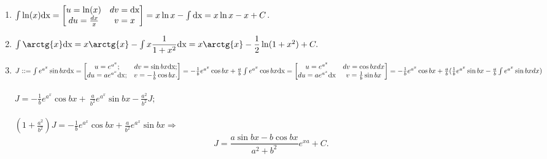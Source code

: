 \begin{example}
	\begin{enumerate}
		\item  $\int \limits \ln(x)\text{dx} =  \begin{bmatrix}   u  = \ln(x) & dv = \text{dx} \\ du = 
			\frac{dx}{x}&   v = x  
		\end{bmatrix}  = x\ln x - \int\limits \text{dx} = x\ln x - x + C$.
		\item  $\int\limits \arctg{x} \dx = x \arctg{x} - \int\limits x 
		\dfrac{1}{1 + x^2}\dx= x \arctg{x} - \dfrac{1}{2}\ln(1 + x^2) + C.$
		\item  $J::=  \int e^{a^x} \sin{bx}\text{dx}= \begin{bmatrix} u = e^{a^x}; & dv = \sin{bx}\text{dx}; \\ du = ae^{a^x}\text{dx}; & v = - 
			\frac{1}{b}\cos bx. \end{bmatrix} =  -  
		\frac{1}{b} 
		e^{a^x} \cos{bx} + 
		\frac{a}{b} \int e^{a^x} \cos{bx} \text{dx} =   \begin{bmatrix} u = e^{a^x} & dv = \cos{bx}dx \\ du = ae^{a^x}\text{dx} & v =  \frac{1}{b} \sin{bx} \end{bmatrix}  =  -  \frac{1}{b}  e^{a^x} \cos{bx} +  \frac{a}{b} (   \frac{1}{b}   e^{a^x} \sin{bx} -  \frac{a}{b}  \int e^{a^x} \sin{bx} dx ) $ \\\\
		$ J = -  \frac{1}{b} e^{a^x}
		\cos{bx} + \ \frac{a}{b^2} e^{a^x} \sin{bx} -  \frac{a^2}{b^2}J;$ \\\\
		$(1 +   \frac{a^2}{b^2}  ) J  = -  \frac{1}{b}   e^{a^x} \cos{bx} + \frac{a}{b^2} e^{a^x} \sin{bx}  \Rightarrow$
		$$J = \frac{a \sin{bx} - b \cos{bx}}{a^2 + b^2} e^{xa} + C.$$
	\end{enumerate}
\end{example}
